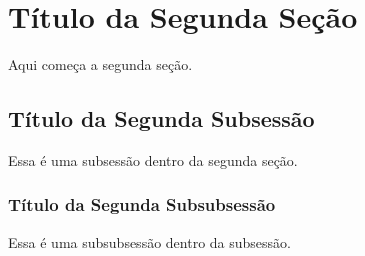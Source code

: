 \documentclass[a4paper,12pt]{report}
\begin{document}
\chapter{Título da Segunda Seção}
Aqui começa a segunda seção.

\lipsum[6] %

\section{Título da Segunda Subsessão}
Essa é uma subsessão dentro da segunda seção.

\lipsum[7] %

\subsection{Título da Segunda Subsubsessão}
Essa é uma subsubsessão dentro da subsessão.

\lipsum[8] %
\end{document}
